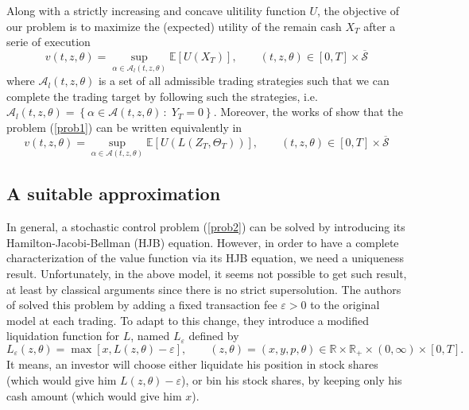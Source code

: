 \documentclass{article}
\newcommand{\bequ}{\begin{equation}}
\newcommand{\eequ}{\end{equation}}
\begin{document}
Along with a strictly increasing and concave ulitility function $U$, the objective of our problem is to maximize the (expected) utility of the remain cash $X_T$ after a serie of execution
\bequ
\label{prob1}
v(t, z, \theta) = \sup\limits_{\alpha \in \mathcal{A}_l(t,z,\theta)}\mathbb{E}\left[U\left(X_T\right)\right], \qquad \left( {t,z,\theta } \right) \in \left[ {0,T} \right] \times \overline {\mathcal{S}}
\eequ
where $\mathcal{A}_l(t,z,\theta)$ is a set of all admissible trading strategies such that we can complete the trading target by following such the strategies, i.e. $\mathcal{A}_l(t,z,\theta) = \left\{\alpha \in \mathcal{A}(t,z,\theta) \, : \; Y_T = 0\right\}$. Moreover, the works of \cite{KP} show that the problem (\ref{prob1}) can be written equivalently in
\bequ
\label{prob2}
v(t, z, \theta) = \sup\limits_{\alpha \in \mathcal{A}(t,z,\theta)}\mathbb{E}\left[U\left(L\left(Z_T, \Theta_T\right)\right)\right], \qquad \left( {t,z,\theta } \right) \in \left[ {0,T} \right] \times \overline {\mathcal{S}}
\eequ



\subsection{A suitable approximation}
\par In general, a stochastic control problem (\ref{prob2}) can be solved by introducing its Hamilton-Jacobi-Bellman (HJB) equation. However, in order to have a complete characterization of the value function via its HJB equation, we need a uniqueness result. Unfortunately, in the above model, it seems not possible to get such result, at least by classical arguments since there is no strict supersolution. The authors of \cite{KP} solved this problem by adding a fixed transaction fee $\varepsilon > 0$ to the original model at each trading. To adapt to this change, they introduce a modified liquidation function for $L$, named $L_{\varepsilon}$ defined by
\[
L_\varepsilon (z, \theta) = \max \left[x, L(z, \theta) - \varepsilon\right], \qquad (z, \theta) = (x, y, p, \theta) \in \mathbb{R}\times\mathbb{R}_+\times (0,\infty)\times [0, T].
\] 
It means, an investor will choose either liquidate his position in stock shares (which would give him $L(z, \theta) - \varepsilon$), or bin his stock shares, by keeping only his cash amount (which would give him $x$). 
\end{document}
